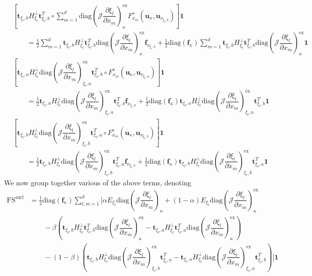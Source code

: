 \documentclass[12pt,a4paper]{article}
\newcommand{\pder}[2][]{\dfrac{\partial #1}{\partial #2}} %
\newcommand{\fn}[1]{\mathcal{#1}} %
\begin{document}
\begin{align*}
& \left[  \bm{t}_{\xi_l, b} H^{\bot}_{\xi_l} \bm{t}_{\xi_l, b}^T \circ \sum_{m=1}^d \text{diag}  \left( \fn{J} \pder[\xi_l]{x_m} \right)_{\kappa}^\text{ex} F^s_{x_m} (\bm{u}_\kappa, \bm{u}_{\nu_{\xi_l,b}}) \right] \bm{1}  \\
 & \qquad =  \frac{1}{2} \sum_{m=1}^d  \bm{t}_{\xi_l, b} H^{\bot}_{\xi_l} \bm{t}_{\xi_l, b}^T \text{diag} \left( \fn{J} \pder[\xi_l]{x_m} \right)_{\kappa}^\text{ex} \bm{f}_{\nu_{\xi_l,b}} + \frac{1}{2} \text{diag} (\bm{f}_\kappa) \sum_{m=1}^d  \bm{t}_{\xi_l, b} H^{\bot}_{\xi_l} \bm{t}_{\xi_l, b}^T \text{diag} \left( \fn{J} \pder[\xi_l]{x_m} \right)_{\kappa}^\text{ex} \bm{1} \\
 & \left[  \bm{t}_{\xi_l, a} H^{\bot}_{\xi_l} \text{diag} \left( \fn{J} \pder[\xi_l]{x_m} \right)_{\xi_l,a}^\text{ex} \bm{t}_{\xi_l, b}^T \circ  F^s_{x_m} (\bm{u}_\kappa, \bm{u}_{\nu_{\xi_l,a}}) \right] \bm{1}  \\
 &  \qquad =  \frac{1}{2}  \bm{t}_{\xi_l, a} H^{\bot}_{\xi_l} \text{diag} \left( \fn{J} \pder[\xi_l]{x_m} \right)_{\xi_l,a}^\text{ex} \bm{t}_{\xi_l, b}^T \bm{f}_{\nu_{\xi_l,a}} + \frac{1}{2} \text{diag} (\bm{f}_\kappa)  \bm{t}_{\xi_l, a} H^{\bot}_{\xi_l} \text{diag} \left( \fn{J} \pder[\xi_l]{x_m} \right)_{\xi_l,a}^\text{ex} \bm{t}_{\xi_l, b}^T \bm{1} \\
& \left[ \bm{t}_{\xi_l, b} H^{\bot}_{\xi_l}  \text{diag} \left( \fn{J} \pder[\xi_l]{x_m} \right)_{\xi_l,b}^\text{ex} \bm{t}_{\xi_l, a}^T \circ F^s_{x_m} (\bm{u}_\kappa, \bm{u}_{\nu_{\xi_l,b}}) \right] \bm{1}  \\
 & \qquad =  \frac{1}{2} \bm{t}_{\xi_l, b} H^{\bot}_{\xi_l}  \text{diag} \left( \fn{J} \pder[\xi_l]{x_m} \right)_{\xi_l,b}^\text{ex} \bm{t}_{\xi_l, a}^T \bm{f}_{\nu_{\xi_l,b}} + \frac{1}{2} \text{diag} (\bm{f}_\kappa) \bm{t}_{\xi_l, b} H^{\bot}_{\xi_l}  \text{diag} \left( \fn{J} \pder[\xi_l]{x_m} \right)_{\xi_l,b}^\text{ex} \bm{t}_{\xi_l, a}^T \bm{1}
\end{align*}
We now group together various of the above terms, denoting
\begin{align*}
\text{FS}^{\text{surf}} &= \frac{1}{2} \text{diag} \left( \bm{f}_\kappa \right) \sum_{l,m=1}^d \Bigg[ \alpha E_{\xi_l}  \text{diag} \left( \fn{J} \pder[\xi_l]{x_m} \right)_{\kappa}  + (1-\alpha) E_{\xi_l}  \text{diag} \left( \fn{J} \pder[\xi_l]{x_m} \right)_{\kappa}^\text{ex}   \\
& \qquad  - \beta \left(  \bm{t}_{\xi_l, b} H^{\bot}_{\xi_l} \bm{t}_{\xi_l, b}^T \text{diag} \left( \fn{J} \pder[\xi_l]{x_m} \right)_{\kappa}^\text{ex}  - \bm{t}_{\xi_l, a} H^{\bot}_{\xi_l} \bm{t}_{\xi_l, a}^T \text{diag} \left( \fn{J} \pder[\xi_l]{x_m} \right)_{\kappa}^\text{ex}   \right) \\
&  \qquad  - (1-\beta) \left( \bm{t}_{\xi_l, b} H^{\bot}_{\xi_l}  \text{diag} \left( \fn{J} \pder[\xi_l]{x_m} \right)_{\xi_l,b}^\text{ex} \bm{t}_{\xi_l, a}^T - \bm{t}_{\xi_l, a} H^{\bot}_{\xi_l} \text{diag} \left( \fn{J} \pder[\xi_l]{x_m} \right)_{\xi_l,a}^\text{ex} \bm{t}_{\xi_l, b}^T  \right) \Bigg] \bm{1}
\end{align*}
\end{document}
